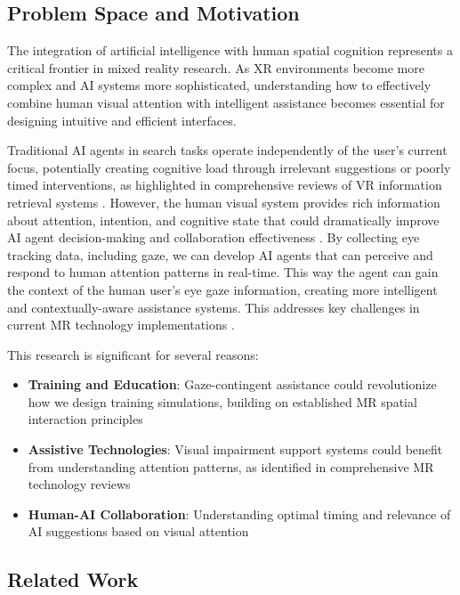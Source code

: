 \documentclass[12pt,letterpaper]{article}
\begin{document}
\subsection{Problem Space and Motivation}

The integration of artificial intelligence with human spatial cognition represents a critical frontier in mixed reality research. As XR environments become more complex and AI systems more sophisticated, understanding how to effectively combine human visual attention with intelligent assistance becomes essential for designing intuitive and efficient interfaces.

Traditional AI agents in search tasks operate independently of the user's current focus, potentially creating cognitive load through irrelevant suggestions or poorly timed interventions, as highlighted in comprehensive reviews of VR information retrieval systems \citep{schleusissinger2021information}. However, the human visual system provides rich information about attention, intention, and cognitive state that could dramatically improve AI agent decision-making and collaboration effectiveness \citep{chiossi2024searching}. By collecting eye tracking data, including gaze, we can develop AI agents that can perceive and respond to human attention patterns in real-time. This way the agent can gain the context of the human user's eye gaze information, creating more intelligent and contextually-aware assistance systems. This addresses key challenges in current MR technology implementations \citep{rokhsaritalemi2020review}. 

This research is significant for several reasons:
\begin{itemize}
    \item \textbf{Training and Education}: Gaze-contingent assistance could revolutionize how we design training simulations, building on established MR spatial interaction principles \citep{barba2017primer}
    \item \textbf{Assistive Technologies}: Visual impairment support systems could benefit from understanding attention patterns, as identified in comprehensive MR technology reviews \citep{rokhsaritalemi2020review}
    \item \textbf{Human-AI Collaboration}: Understanding optimal timing and relevance of AI suggestions based on visual attention
\end{itemize}

\subsection{Related Work}
\end{document}
